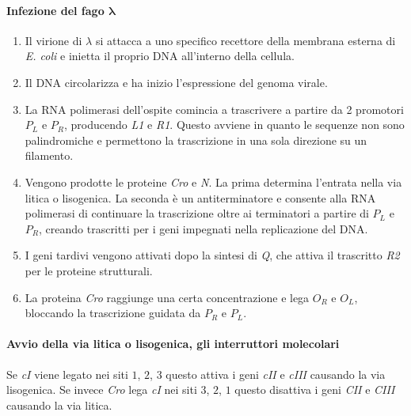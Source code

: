 			\paragraph{Infezione del fago $\mathbf{\lambda}$}
			\begin{multicols}{2}
				\begin{enumerate}
    					\item Il virione di $\lambda$ si attacca a uno specifico recettore della membrana esterna di \textit{E. coli} e inietta il proprio DNA all'interno della cellula.
    					\item Il DNA circolarizza e ha inizio l'espressione del genoma virale.
					\item La RNA polimerasi dell'ospite comincia a trascrivere a partire da 2 promotori \emph{$P_L$} e \emph{$P_R$}, producendo \emph{L1} e \emph{R1}.
						Questo avviene in quanto le sequenze non sono palindromiche e permettono la trascrizione in una sola direzione su un filamento.
					\item Vengono prodotte le proteine \emph{Cro} e \emph{N}.
						La prima determina l'entrata nella via litica o lisogenica.
						La seconda \`e un antiterminatore e consente alla RNA polimerasi di continuare la trascrizione oltre ai terminatori a partire di \emph{$P_L$} e \emph{$P_R$}, creando trascritti per i geni impegnati nella replicazione del DNA.
					\item I geni tardivi vengono attivati dopo la sintesi di \emph{Q}, che attiva il trascritto \emph{R2} per le proteine strutturali.
					\item La proteina \emph{Cro} raggiunge una certa concentrazione e lega \emph{$O_R$} e \emph{$O_L$}, bloccando la trascrizione guidata da \emph{$P_R$} e \emph{$P_L$}.
				\end{enumerate}
			\end{multicols}
			
			\paragraph{Avvio della via litica o lisogenica, gli interruttori molecolari}
			Se \emph{cI} viene legato nei siti $1$, $2$, $3$ questo attiva i geni \emph{cII} e \emph{cIII} causando la via lisogenica.
			Se invece \emph{Cro} lega \emph{cI} nei siti $3$, $2$, $1$ questo disattiva i geni \emph{CII} e \emph{CIII} causando la via litica.

